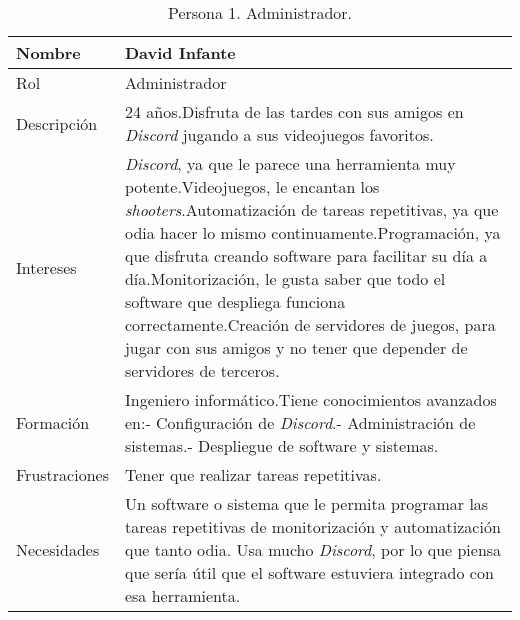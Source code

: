 \begin{table}[H]
    \centering
    \def\arraystretch{1.25}
    \begin{adjustbox}{max width=\textwidth}
    \begin{tabularx}{\textwidth}{l|L}
    \hline
        \textbf{Nombre} & \textbf{David Infante} \\ \hline
    \hline
        Rol & Administrador \\ \hline
        Descripción & 24 años.\linebreak Disfruta de las tardes con sus amigos en \textit{Discord} jugando a sus videojuegos favoritos. \\ \hline
        Intereses & \textit{Discord}, ya que le parece una herramienta muy potente.\linebreak Videojuegos, le encantan los \textit{shooters}.\linebreak Automatización de tareas repetitivas, ya que odia hacer lo mismo continuamente.\linebreak Programación, ya que disfruta creando software para facilitar su día a día.\linebreak Monitorización, le gusta saber que todo el software que despliega funciona correctamente.\linebreak Creación de servidores de juegos, para jugar con sus amigos y no tener que depender de servidores de terceros. \\ \hline
        Formación & Ingeniero informático.\linebreak Tiene conocimientos avanzados en:\linebreak - Configuración de \textit{Discord}.\linebreak - Administración de sistemas.\linebreak - Despliegue de software y sistemas. \\ \hline
        Frustraciones & Tener que realizar tareas repetitivas. \\ \hline
        Necesidades & Un software o sistema que le permita programar las tareas repetitivas de monitorización y automatización que tanto odia. Usa mucho \textit{Discord}, por lo que piensa que sería útil que el software estuviera integrado con esa herramienta. \\ \hline
    \end{tabularx}
    \end{adjustbox}
    \caption{Persona 1. Administrador.}
\end{table}


